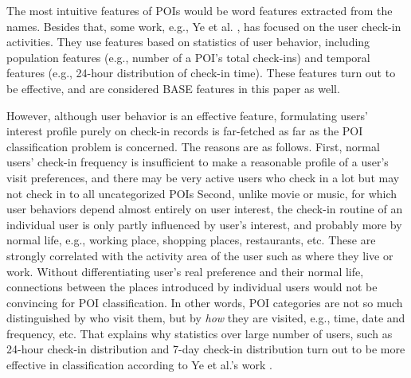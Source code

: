 The most intuitive features of POIs would be word features extracted
from the names. Besides that, some work, e.g., Ye et al. \cite{yemao},
has focused on the user check-in activities.
They use features based on statistics of user behavior,
including population features (e.g., number of a POI's total check-ins)
and temporal features (e.g., 24-hour distribution of check-in time).
These features turn out to be effective, and are considered BASE features
in this paper as well.

However, although user behavior is an effective feature,
formulating users' interest profile purely on check-in records is
far-fetched as far as the POI classification problem is concerned.
The reasons are as follows.
First, normal users' check-in frequency is insufficient to make a
reasonable profile of a user's visit preferences,
and there may be very active users who check in a lot but may not check in
to all uncategorized POIs
Second, unlike movie or music, for which user behaviors depend almost
entirely on user interest, the check-in routine of an individual user
is only partly influenced by user's interest,
and probably more by normal life, e.g., working place, shopping places,
restaurants, etc. These are strongly correlated with the activity area of
the user such as where they live or work.
Without differentiating user's real preference and their normal life,
connections between the places introduced by individual users would not
be convincing for POI classification. In other words, POI categories are not
so much distinguished by who visit them, but by {\em how} they are visited,
e.g., time, date and frequency, etc.
That explains why statistics over large number of users,
such as 24-hour check-in distribution and 7-day check-in distribution turn
out to be more effective in classification according to Ye et al.'s work \cite{yemao}.

